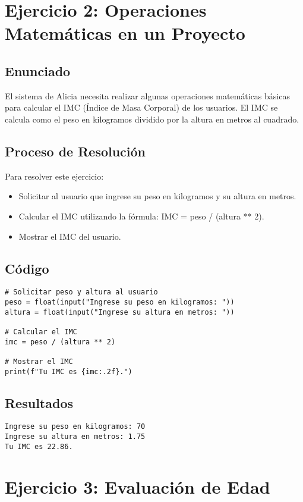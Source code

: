 \documentclass[a4paper,12pt]{article}
\begin{document}
\newpage
\section{Ejercicio 2: Operaciones Matemáticas en un Proyecto}

\subsection{Enunciado}
El sistema de Alicia necesita realizar algunas operaciones matemáticas básicas para calcular el IMC (Índice de Masa Corporal) de los usuarios. El IMC se calcula como el peso en kilogramos dividido por la altura en metros al cuadrado.

\subsection{Proceso de Resolución}
Para resolver este ejercicio:
\begin{itemize}
    \item Solicitar al usuario que ingrese su peso en kilogramos y su altura en metros.
    \item Calcular el IMC utilizando la fórmula: IMC = peso / (altura ** 2).
    \item Mostrar el IMC del usuario.
\end{itemize}

\subsection{Código}
\begin{lstlisting}
# Solicitar peso y altura al usuario
peso = float(input("Ingrese su peso en kilogramos: "))
altura = float(input("Ingrese su altura en metros: "))

# Calcular el IMC
imc = peso / (altura ** 2)

# Mostrar el IMC
print(f"Tu IMC es {imc:.2f}.")
\end{lstlisting}

\subsection{Resultados}
\begin{verbatim}
Ingrese su peso en kilogramos: 70
Ingrese su altura en metros: 1.75
Tu IMC es 22.86.
\end{verbatim}

\newpage
\section{Ejercicio 3: Evaluación de Edad}
\end{document}
